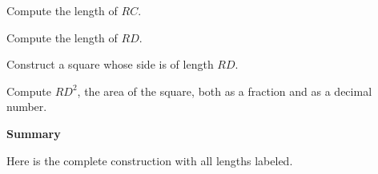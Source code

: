 \exer{}
Compute the length of $RC$.


\exer{}
Compute the length of $RD$.



\exer{}
Construct a square whose side is of length $RD$.


\exer{}
Compute $RD^2$, the area of the square, both as a fraction and as a decimal number.


\newpage


\begin{center}
\textbf{\Large Summary}
\end{center}

Here is the complete construction with all lengths labeled.

\bigskip

